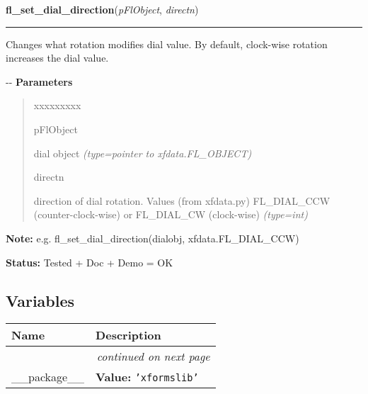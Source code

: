 \hspace{.8\funcindent}\begin{boxedminipage}{\funcwidth}

    \raggedright \textbf{fl\_set\_dial\_direction}(\textit{pFlObject}, \textit{directn})

    \vspace{-1.5ex}

    \rule{\textwidth}{0.5\fboxrule}
\setlength{\parskip}{2ex}

Changes what rotation modifies dial value. By default, clock-wise
rotation increases the dial value.

-{}-
\setlength{\parskip}{1ex}
      \textbf{Parameters}
      \vspace{-1ex}

      \begin{quote}
        \begin{Ventry}{xxxxxxxxx}

          \item[pFlObject]


dial object
            {\it (type=pointer to xfdata.FL\_OBJECT)}

          \item[directn]


direction of dial rotation. Values (from xfdata.py) FL\_DIAL\_CCW
(counter-clock-wise) or FL\_DIAL\_CW (clock-wise)
            {\it (type=int)}

        \end{Ventry}

      \end{quote}

\textbf{Note:} 
e.g. fl\_set\_dial\_direction(dialobj, xfdata.FL\_DIAL\_CCW)


\textbf{Status:} 
Tested + Doc + Demo = OK


    \end{boxedminipage}



  \subsection{Variables}

    \vspace{-1cm}
\hspace{\varindent}\begin{longtable}{|p{\varnamewidth}|p{\vardescrwidth}|l}
\cline{1-2}
\cline{1-2} \centering \textbf{Name} & \centering \textbf{Description}& \\
\cline{1-2}
\endhead\cline{1-2}\multicolumn{3}{r}{\small\textit{continued on next page}}\\\endfoot\cline{1-2}
\endlastfoot\raggedright \_\-\_\-p\-a\-c\-k\-a\-g\-e\-\_\-\_\- & \raggedright \textbf{Value:} 
{\tt \texttt{'}\texttt{xformslib}\texttt{'}}&\\
\cline{1-2}
\end{longtable}

